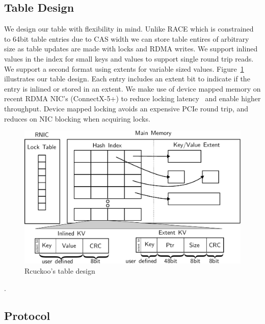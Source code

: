 \subsection{Table Design}

We design our table with flexibility in mind. Unlike RACE
which is constrained to 64bit table entries due to CAS width
we can store table entires of arbitrary size as table
updates are made with locks and RDMA writes. We support
inlined values in the index for small keys and values to
support single round trip reads. We support a second format
using extents for variable sized values.
Figure~\ref{fig:table-diagram} illustrates our table design.
Each entry includes an extent bit to indicate if the entry
is inlined or stored in an extent.  We make use of device
mapped memory on recent RDMA NIC's (ConnectX-5+) to reduce
locking latency~\cite{sherman} and enable higher throughput.
Device mapped locking avoids an expensive PCIe round trip,
and reduces on NIC blocking when acquiring locks.


\begin{figure}[t]
    \includegraphics[width=0.99\linewidth]{fig/table-diagram.pdf}
    \caption{Rcuckoo's table design}
    \label{fig:table-diagram}
\end{figure}.


\subsection{Protocol}

